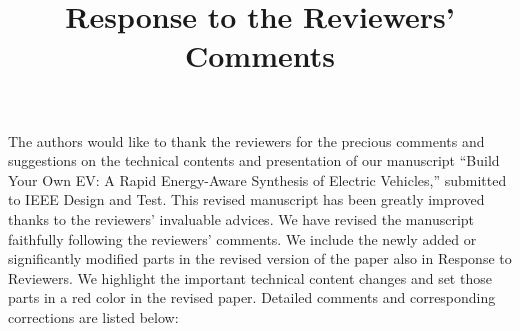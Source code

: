 \documentclass[onecolumn]{IEEEconf}
\title{Response to the Reviewers' Comments}
\begin{document}
\maketitle

The authors would like to thank the reviewers for the precious comments and suggestions on the technical contents and presentation of our manuscript ``Build Your Own EV: A Rapid Energy-Aware Synthesis of Electric Vehicles,'' submitted to IEEE Design and Test. This revised manuscript has been greatly improved thanks to the reviewers’ invaluable advices. We have revised the manuscript faithfully following the reviewers’ comments. We include the newly added or significantly modified parts in the revised version of the paper also in Response to Reviewers. We highlight the important technical content changes and set those parts in a red color in the revised paper. Detailed comments and corresponding corrections are listed below:\\
\end{document}
